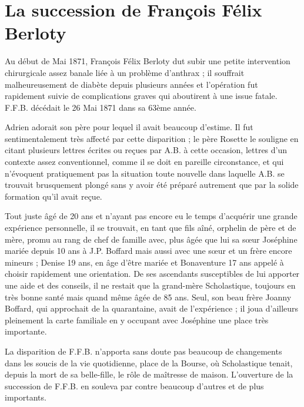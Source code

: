 \documentclass[11pt,a4paper]{report}
\begin{document}
\chapter{La succession de François Félix Berloty}\label{la-succession-de-franuxe7ois-fuxe9lix-berloty}

Au début de Mai 1871, François Félix Berloty dut subir une petite intervention chirurgicale assez banale liée à un problème d'anthrax ; il souffrait malheureusement de diabète depuis plusieurs années et l'opération fut rapidement suivie de complications graves qui aboutirent à une issue fatale. F.F.B. décédait le 26 Mai 1871 dans sa 63ème année.

Adrien adorait son père pour lequel il avait beaucoup d'estime. Il fut sentimentalement très affecté par cette disparition ; le père Rosette le souligne en citant plusieurs lettres écrites ou reçues par A.B. à cette occasion, lettres d'un contexte assez conventionnel, comme il se doit en pareille circonstance, et qui n'évoquent pratiquement pas la situation toute nouvelle dans laquelle A.B. se trouvait brusquement plongé sans y avoir été préparé autrement que par la solide formation qu'il avait reçue.


Tout juste âgé de 20 ans et n'ayant pas encore eu le temps d'acquérir une grande expérience personnelle, il se trouvait, en tant que fils aîné, orphelin de père et de mère, promu au rang de chef de famille avec, plus âgée que lui sa sœur Joséphine mariée depuis 10 ans à J.P. Boffard mais aussi avec une sœur et un frère encore mineurs ; Denise 19 ans, en âge d'être mariée et Bonaventure 17 ans appelé à choisir rapidement une orientation. De ses ascendants susceptibles de lui apporter une aide et des conseils, il ne restait que la grand-mère Scholastique, toujours en très bonne santé mais quand même âgée de 85 ans. Seul, son beau frère Joanny Boffard, qui approchait de la quarantaine, avait de l'expérience ; il joua d'ailleurs pleinement la carte familiale en y occupant avec Joséphine une place très importante.

La disparition de F.F.B. n'apporta sans doute pas beaucoup de changements dans les soucis de la vie quotidienne, place de la Bourse, où Scholastique tenait, depuis la mort de sa belle-fille, le rôle de maîtresse de maison. L'ouverture de la succession de F.F.B. en souleva par contre beaucoup d'autres et de plus importants.
\end{document}
